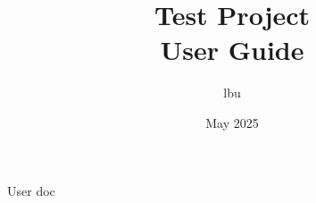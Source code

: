 \documentclass[a4paper]{report}
\title{Test Project\\ User Guide}
\author{lbu}
\date{May 2025}
\begin{document}
User doc
\end{document}
